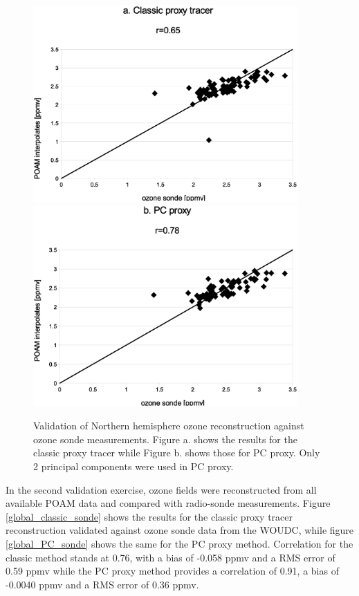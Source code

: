 \begin{figure}
  \centering
  \includegraphics[width=0.9\textwidth]{Nhemi_classic_sonde}
  \includegraphics[width=0.9\textwidth]{Nhemi_PC_sonde}
  \caption{Validation of Northern hemisphere ozone reconstruction against ozone sonde measurements. 
  Figure a. shows the results for the classic proxy tracer while Figure b. shows those for PC proxy.
  Only 2 principal components were used in PC proxy.}
  \label{Nhemi_sonde}
\end{figure}

In the second validation exercise, ozone fields were reconstructed from 
all available POAM data and compared with radio-sonde measurements.
Figure \ref{global_classic_sonde} shows the results for the classic proxy
tracer reconstruction validated against ozone sonde data from the WOUDC,
while figure \ref{global_PC_sonde} shows the same for the PC proxy method.
Correlation for the classic method stands at 0.76, with a bias of -0.058 ppmv
and a RMS error of 0.59 ppmv while the PC proxy method provides a correlation
of 0.91, a bias of -0.0040 ppmv and a RMS error of 0.36 ppmv.

